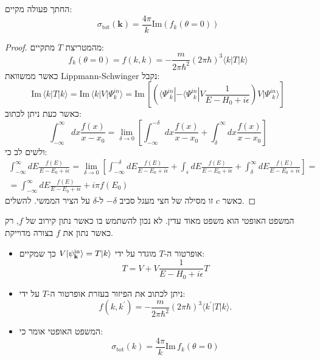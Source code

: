 \documentclass{tstextbook}
\begin{document}
\begin{proposition}
החתך פעולה מקיים:
$$\sigma_{\text{tot}}\left( \mathbf{k} \right)=\frac{4\pi}{k}\mathrm{Im}\left( f_{k}\left( \theta=0 \right) \right)$$

\end{proposition}
\begin{proof}
מהמטריצת \(T\) מתקיים:
$$f_{k}\left( \theta=0 \right)=f(k,k)=-\frac{m}{2\pi\hbar^{2}}\left( 2\pi\hbar \right)^{3}\langle k|T|k\rangle$$
כאשר ממשוואת Lippmann-Schwinger נקבל:
$$\mathrm{Im}\,\langle k|T|k\rangle=\mathrm{Im}\,\langle k|V|\Psi_{k}^{i n}\rangle=\mathrm{Im}\,\left[\left(\langle\Psi_{\,\,k}^{i n}|-\langle\Psi_{\,\,k}^{i n}|V\frac{1}{E-H_{0}+i\epsilon}\right)V|\Psi_{\,\,k}^{i n}\rangle\right]$$
כאשר כעת ניתן לכתוב:
$$\int_{-\infty}^{\infty}d x{\frac{f(x)}{x-x_{0}}}=\operatorname*{lim}_{\delta\to0}\left[\int_{-\infty}^{-\delta}d x{\frac{f(x)}{x-x_{0}}}+\int_{\delta}^{\infty}d x{\frac{f(x)}{x-x_{0}}}\right]$$
ולשים לב כי:
\begin{gather*}\int_{-\infty}^{\infty}d E\frac{f(E)}{E-E_{0}+i\epsilon}=\lim_{\delta\to0}\left[\int_{-\infty}^{-\delta}\!d E\frac{f(E)}{E-E_{0}+i\epsilon}+\int_{\epsilon}\!d E\frac{f(E)}{E-E_{0}+i\epsilon}+\int_{\delta}^{\infty}\!d E\frac{f(E)}{E-E_{0}+i\epsilon}\right]=\\=\int_{-\infty}^{\infty}d E\frac{f(E)}{E-E_{0}+i\epsilon}+i\pi f(E_{0}) 
\end{gather*}
כאשר \(c\) זו מסילה של חצי מעגל סביב \(-\delta\) ל-\(\delta\) על הציר הממשי. להשלים.

\end{proof}
\begin{remark}
המשפט האופטי הוא משפט מאוד עדין. לא נכון להשתמש בו כאשר נתון קירוב של \(f\), רק כאשר נתון את \(f\) בצורה מדוייקת.

\end{remark}
\begin{summary}
  \begin{itemize}
    \item אופרטור ה-\(T\) מוגדר על ידי \(V|\psi_{\bf k}^{\mathrm{in}}\rangle=T|k\rangle\) כך שמקיים:
$$T=V+V\frac{1}{E-H_{0}+i\epsilon}T$$
    \item ניתן לכתוב את הפיזור בעזרת אופרטור ה-\(T\) על ידי:
$$f(k,k^{\prime})=-\frac{m}{2\pi\hbar^{2}}(2\pi\hbar)^{3}\langle k^{\prime}|T|k\rangle.$$
    \item המשפט האופטי אומר כי:
$$\sigma_{\mathrm{tot}}(k)=\frac{4\pi}{k}\mathrm{Im}\,f_{k}(\theta=0)$$
  \end{itemize}
\end{summary}
\end{document}
